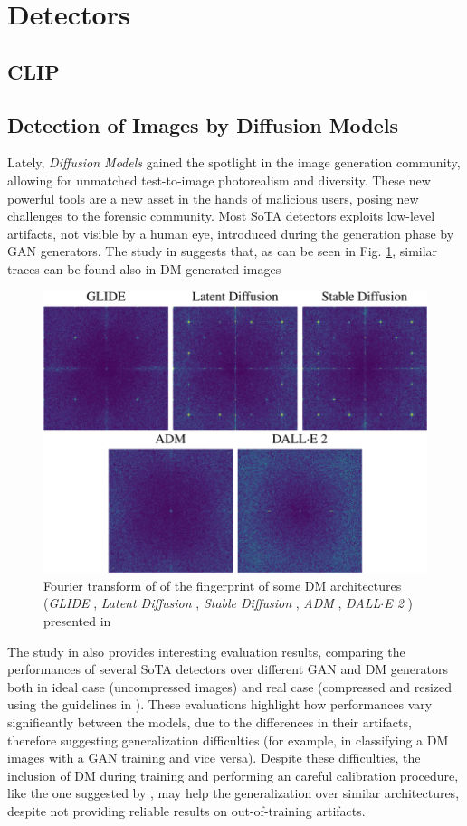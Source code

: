 \documentclass[conference]{IEEEtran} %
\begin{document}
\section{Detectors}
    \subsection{CLIP}
    \subsection{Detection of Images by Diffusion Models} 
        Lately, \textit{Diffusion Models} gained the spotlight in the image generation community, allowing for unmatched test-to-image photorealism and diversity. These new powerful tools are a new asset in the hands of malicious users, posing new challenges to the forensic community. Most SoTA detectors exploits low-level artifacts, not visible by a human eye, introduced during the generation phase by GAN generators. The study in \cite{corvi2023detection} suggests that, as can be seen in Fig. \ref{fig:pizza_fourier}, similar traces can be found also in DM-generated images

        \begin{figure}[h]
            \centering
            \includegraphics[width=0.6\linewidth]{Img/pizza_fourier.png}
            \caption{Fourier transform of of the fingerprint of some DM architectures (\textit{GLIDE} \cite{nichol2021glide}, \textit{Latent Diffusion} \cite{rombach2022high}, \textit{Stable Diffusion} \cite{stablediffusion2022}, \textit{ADM} \cite{dhariwal2021diffusion}, \textit{DALL$\cdot$E 2} \cite{ramesh2022hierarchical}) presented in \cite{corvi2023detection}}
            \label{fig:pizza_fourier}
        \end{figure}

        The study in \cite{corvi2023detection} also provides interesting evaluation results, comparing the performances of several SoTA detectors over different GAN and DM generators both in ideal case (uncompressed images) and real case (compressed and resized using the guidelines in \cite{vipcuplink}). These evaluations highlight how performances vary significantly between the models, due to the differences in their artifacts, therefore suggesting generalization difficulties (for example, in classifying a DM images with a GAN training and vice versa). Despite these difficulties, the inclusion of DM during training and performing an careful calibration procedure, like the one suggested by \cite{Platt1999probabilistic}, may help the generalization over similar architectures, despite not providing reliable results on out-of-training artifacts.
\end{document}
